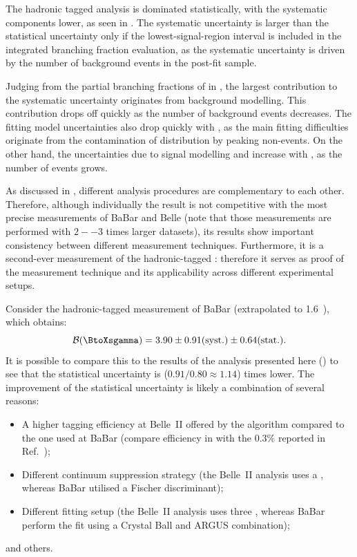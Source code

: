 The hadronic tagged \BtoXsgamma analysis is dominated statistically, with the systematic components lower, as seen in .
The systematic uncertainty is larger than the statistical uncertainty only if the lowest-\EB signal-region interval is included in the integrated branching fraction evaluation, 
as the systematic uncertainty is driven by the number of background events in the post-fit sample.

Judging from the partial branching fractions of \BtoXsgamma in ,
the largest contribution to the systematic uncertainty originates from background modelling.
This contribution drops off quickly as the number of background events decreases.
The \Mbc fitting model uncertainties also drop quickly with \EB, as the main fitting difficulties originate from the contamination of \Mbc distribution by peaking non-\BtoXsgamma events.
On the other hand, the uncertainties due to signal modelling and \BtoXdgamma increase with \EB, as the number of \BtoXsdgamma events grows.

As discussed in , different analysis procedures are complementary to each other.
Therefore, although individually the result is not competitive with the most precise measurements of BaBar and Belle (note that those measurements are performed with $2--3$ times larger datasets),
its results show important consistency between different measurement techniques.
Furthermore, it is a second-ever measurement of the hadronic-tagged \BtoXsgamma: therefore it serves as proof of the measurement technique and its applicability across different experimental setups.

Consider the hadronic-tagged measurement of BaBar \cite{BaBar:2007yhb} (extrapolated to 1.6~\gev), which obtains:
\begin{equation}\label{eq:babar_measurement}
    \mathcal{B}(\BtoXsgamma) = 3.90 \pm 0.91 \mathrm{(syst.)} \pm 0.64 \mathrm{(stat.)}.
\end{equation}
It is possible to compare this to the results of the analysis presented here ()
to see that the statistical uncertainty is ($0.91/0.80\approx1.14$) times lower.
The improvement of the statistical uncertainty is likely a combination of several reasons:
\begin{itemize}
    \item A higher tagging efficiency at Belle~II offered by the \FEI algorithm compared to the one used at BaBar (compare \FEI efficiency in  with the 0.3\% reported in Ref.~\cite{BaBar:2007yhb});
    \item Different continuum suppression strategy (the Belle~II analysis uses a \BDT, whereas BaBar utilised a Fischer discriminant);
    \item Different fitting setup (the Belle~II analysis uses three , whereas BaBar perform the fit using a Crystal Ball and ARGUS \PDF combination);
\end{itemize}
and others.

